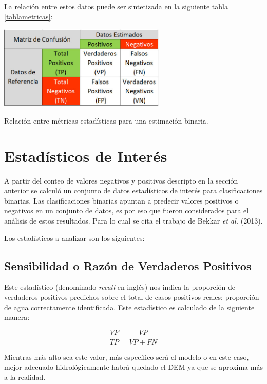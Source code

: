 \documentclass[10pt,a4paper, twoside]{report}
\begin{document}
La relación entre estos datos puede ser sintetizada en la siguiente tabla \ref{tablametricas}:

\begin{table}[H]
   \centering      
   \includegraphics[width=0.6\textwidth]{imagenes/tablametricas.jpg}
 \caption{Relación entre métricas estadísticas para una estimación binaria.}
 \label{tablametricas}
\end{table}



\section{Estadísticos de Interés}

A partir del conteo de valores negativos y positivos descripto en la sección anterior se calculó un conjunto de datos estadísticos de interés para clasificaciones binarias.  Las clasificaciones binarias apuntan a predecir valores positivos o negativos en un conjunto de datos, es por eso que fueron considerados para el análisis de estos resultados. Para lo cual se cita el trabajo de Bekkar \textit{et al.} (2013).

Los estadísticos a analizar son los siguientes:

\subsection{Sensibilidad o Razón de Verdaderos Positivos}

Este estadístico (denominado \textit{recall} en inglés) nos indica la proporción de verdaderos positivos predichos sobre el total de casos positivos reales; proporción de agua correctamente identificada. Este estadístico es calculado de la siguiente manera: 

\begin{equation}
\frac{VP}{TP}=\frac{VP}{VP + FN}
\end{equation}

Mientras más alto sea este valor, más específico será el modelo o en este caso, mejor adecuado hidrológicamente habrá quedado el DEM ya que se aproxima más a la realidad.
\end{document}
